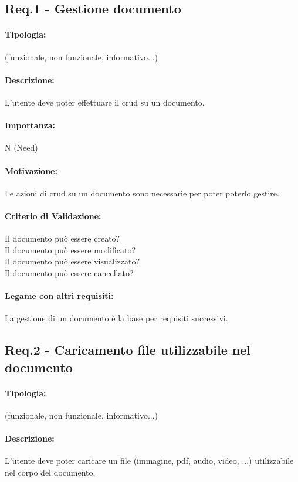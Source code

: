 \subsection{Req.1 - Gestione documento}
\paragraph{Tipologia:}
	(funzionale, non funzionale, informativo...)
\paragraph{Descrizione:}
	L'utente deve poter effettuare il \gls{crud} su un documento.
\paragraph{Importanza:}
	N (Need)
\paragraph{Motivazione:}
	Le azioni di \gls{crud} su un documento sono necessarie per poter poterlo gestire.
\paragraph{Criterio di Validazione:}
	Il documento può essere creato?\\
	Il documento può essere modificato?\\
	Il documento può essere visualizzato?\\
	Il documento può essere cancellato?
\paragraph{Legame con altri requisiti:}
	La gestione di un documento è la base per requisiti successivi.

\subsection{Req.2 - Caricamento file utilizzabile nel documento}
\paragraph{Tipologia:}
	(funzionale, non funzionale, informativo...)
\paragraph{Descrizione:}
	L'utente deve poter caricare un file (immagine, pdf, audio, video, ...) utilizzabile nel corpo del documento.
